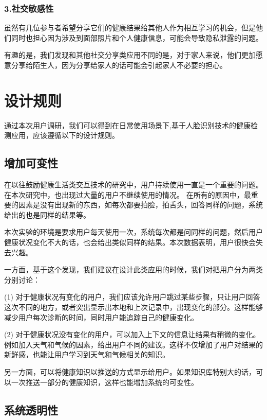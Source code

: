 \subsubsection{3.社交敏感性}

虽然有几位参与者希望分享它们的健康结果给其他人作为相互学习的机会，但是他们同时也担心因为涉及到面部照片和个人健康信息，可能会导致隐私泄露的问题。


有趣的是，我们发现和其他社交分享类应用不同的是，对于家人来说，他们更加愿意分享给陌生人，因为分享给家人的话可能会引起家人不必要的担心。


\section{设计规则}

通过本次用户调研，我们可以得到在日常使用场景下,基于人脸识别技术的健康检测应用，应该遵循以下的设计规则。

\subsection{增加可变性}
在以往鼓励健康生活类交互技术的研究中，用户持续使用一直是一个重要的问题。在本次研究中，也出现过大量的用户不继续使用的情况。
在所有的原因中，最重要的因素是没有出现新的东西，如每次都要拍脸，拍舌头，回答同样的问题，系统给出的也是同样的结果等。

本次实验的环境是要求用户每天使用一次，系统每次都是问同样的问题，然后用户健康状况变化不大的话，也会给出类似同样的结果。本次数据表明，用户很快会失去兴趣。

一方面，基于这个发现，我们建议在设计此类应用的时候，我们对把用户分为两类分别讨论：

(1) 对于健康状况有变化的用户，我们应该允许用户跳过某些步骤，只让用户回答这次不同的地方，或者突出显示出本地和上次记录中，出现变化的部分。这样能够减少用户每次诊断的时间，同时用户能追踪自己的健康变化。

(2) 对于健康状况没有变化的用户，可以加入上下文的信息让结果有稍微的变化。例如加入天气和气候的因素，给出用户不同的建议。这样不仅增加了用户对结果的新鲜感，也能让用户学习到天气和气候相关的知识。

另一方面，可以将健康知识以推送的方式显示给用户。如果知识库特别大的话，可以一次推送一部分的健康知识，这样也能增加系统的可变性。

\subsection{系统透明性}

